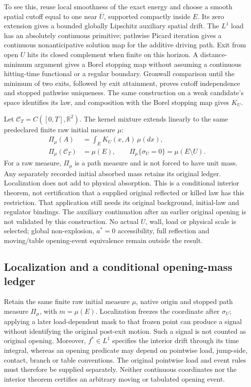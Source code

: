 \documentclass[11pt]{article}
\begin{document}
To see this, reuse local smoothness of the exact energy and choose a smooth
spatial cutoff equal to one near $\overline U$, supported compactly inside
$E$. Its zero extension gives a bounded globally Lipschitz auxiliary
spatial drift. The $L^1$ load has an absolutely continuous primitive;
pathwise Picard iteration gives a continuous nonanticipative solution map
for the additive driving path. Exit from open $U$ hits its closed
complement when finite on this horizon. A distance-minimum argument gives
a Borel stopping map without assuming a continuous hitting-time functional
or a regular boundary. Gronwall comparison until the minimum of two exits,
followed by exit attainment, proves cutoff independence and stopped
pathwise uniqueness. The same construction on a weak candidate's space
identifies its law, and composition with the Borel stopping map gives $K_U$.

Let $\mathcal C_T=C([0,T],\mathbb R^2)$. The kernel mixture extends
linearly to the same predeclared finite raw initial measure $\mu$:
\begin{equation}
\begin{aligned}
 \Pi_\mu(A)&=\int_E K_U(x,A)\,\mu(dx),\\
 \Pi_\mu(\mathcal C_T)&=\mu(E),\qquad
 \Pi_\mu\{\sigma_U=0\}=\mu(E\setminus U).
\end{aligned}
\end{equation}
For a raw measure, $\Pi_\mu$ is a path measure and is not forced to have
unit mass. Any separately recorded initial absorbed mass retains its
original ledger. Localization does not add to physical absorption.
This is a conditional interior theorem, not certification that a supplied
original reflected or killed law has this restriction. That application
still needs its original background, initial-law and regulator bindings.
The auxiliary continuation after an earlier original opening is not
validated by this construction. No actual $U$, wall, load or physical
scale is selected; global non-explosion, $a^*=0$ accessibility, full
reflection and moving/table opening-event equivalence remain outside
the result.


\subsection{Localization and a conditional opening-mass ledger}
Retain the same finite raw initial measure $\mu$, native origin and
stopped path measure $\Pi_\mu$, with $m=\mu(E)$. Localization freezes
the coordinate after $\sigma_U$; applying a later load-dependent mask to
that frozen point can produce a signal without identifying the original
post-exit motion. Such a signal is not counted as original opening.
Moreover, $f^*\in L^1$ specifies the interior drift through its time
integral, whereas an opening predicate may depend on pointwise load,
jump-side, contact, branch or table conventions. The original pointwise
load and event rules must therefore be supplied separately. Neither
continuous coordinates nor the interior theorem certifies an arbitrary
moving or tabulated opening event.
\end{document}

